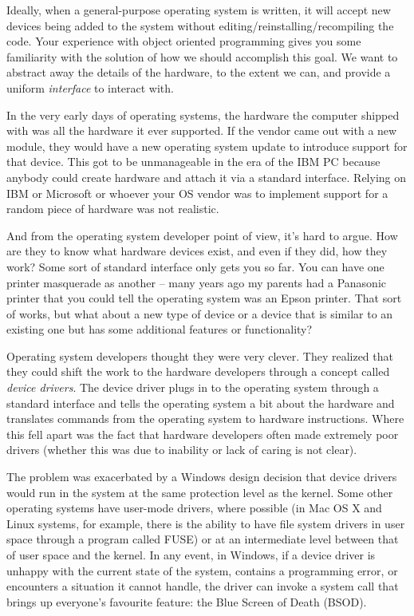 Ideally, when a general-purpose operating system is written, it will accept new devices being added to the system without editing/reinstalling/recompiling the code. Your experience with object oriented programming gives you some familiarity with the solution of how we should accomplish this goal. We want to abstract away the details of the hardware, to the extent we can, and provide a uniform \textit{interface} to interact with. 

In the very early days of operating systems, the hardware the computer shipped with was all the hardware it ever supported. If the vendor came out with a new module, they would have a new operating system update to introduce support for that device. This got to be unmanageable in the era of the IBM PC because anybody could create hardware and attach it via a standard interface. Relying on IBM or Microsoft or whoever your OS vendor was to implement support for a random piece of hardware was not realistic.

And from the operating system developer point of view, it's hard to argue. How are they to know what hardware devices exist, and even if they did, how they work? Some sort of standard interface only gets you so far. You can have one printer masquerade as another -- many years ago my parents had a Panasonic printer that you could tell the operating system was an Epson printer. That sort of works, but what about a new type of device or a device that is similar to an existing one but has some additional features or functionality?

Operating system developers thought they were very clever. They realized that they could shift the work to the hardware developers through a concept called \textit{device drivers}. The device driver plugs in to the operating system through a standard interface and tells the operating system a bit about the hardware and translates commands from the operating system to hardware instructions. Where this fell apart was the fact that hardware developers often made extremely poor drivers (whether this was due to inability or lack of caring is not clear).

The problem was exacerbated by a Windows design decision that device drivers would run in the system at the same protection level as the kernel. Some other operating systems have user-mode drivers, where possible (in Mac OS X and Linux systems, for example, there is the ability to have file system drivers in user space through a program called FUSE) or at an intermediate level between that of user space and the kernel. In any event, in Windows, if a device driver is unhappy with the current state of the system, contains a programming error, or encounters a situation it cannot handle, the driver can invoke a system call that brings up everyone's favourite feature: the Blue Screen of Death (BSOD).

